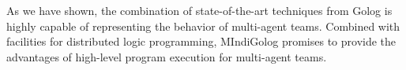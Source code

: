\documentclass[letterpaper]{article}
\begin{document}
As we have shown, the combination of state-of-the-art
techniques from Golog is highly capable of representing the behavior
of multi-agent teams. Combined with facilities for distributed logic
programming, MIndiGolog promises to provide the advantages of high-level
program execution for multi-agent teams.



\end{document}
